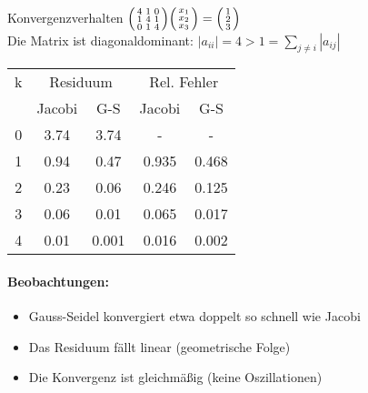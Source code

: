 \begin{example2}{Konvergenzverhalten}
$\begin{psmallmatrix}
4 & 1 & 0\\
1 & 4 & 1\\
0 & 1 & 4
\end{psmallmatrix}
\begin{psmallmatrix}
x_1\\
x_2\\
x_3
\end{psmallmatrix} =
\begin{psmallmatrix}
1\\
2\\
3
\end{psmallmatrix}$
\vspace{1mm}\\
Die Matrix ist diagonaldominant:
$|a_{ii}| = 4 > 1 = \sum_{j\neq i} |a_{ij}|$
\vspace{1mm}\\
\begin{tabular}{c|cc|cc}
k & \multicolumn{2}{c|}{Residuum} & \multicolumn{2}{c}{Rel. Fehler}\\
& Jacobi & G-S & Jacobi & G-S\\
\hline
0 & 3.74 & 3.74 & - & -\\
1 & 0.94 & 0.47 & 0.935 & 0.468\\
2 & 0.23 & 0.06 & 0.246 & 0.125\\
3 & 0.06 & 0.01 & 0.065 & 0.017\\
4 & 0.01 & 0.001 & 0.016 & 0.002
\end{tabular}

\paragraph{Beobachtungen:}
\begin{itemize}
    \item Gauss-Seidel konvergiert etwa doppelt so schnell wie Jacobi
    \item Das Residuum fällt linear (geometrische Folge)
    \item Die Konvergenz ist gleichmäßig (keine Oszillationen)
\end{itemize}
\end{example2}

